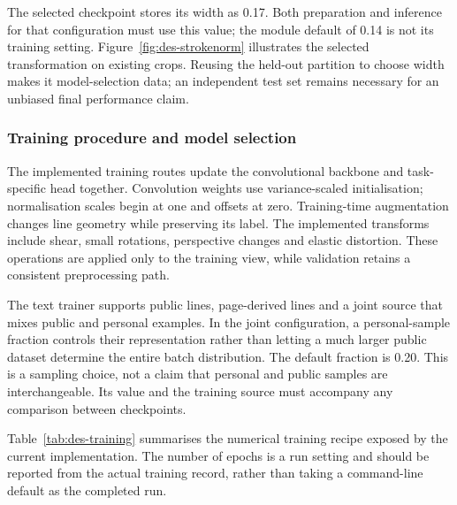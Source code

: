 The selected checkpoint stores its width as 0.17. Both preparation and inference for that configuration must use this value; the module default of 0.14 is not its training setting. Figure~\ref{fig:des-strokenorm} illustrates the selected transformation on existing crops. Reusing the held-out partition to choose width makes it model-selection data; an independent test set remains necessary for an unbiased final performance claim.


\subsubsection{Training procedure and model selection}
\label{sec:des-training}
The implemented training routes update the convolutional backbone and task-specific head together. Convolution weights use variance-scaled initialisation; normalisation scales begin at one and offsets at zero. Training-time augmentation changes line geometry while preserving its label. The implemented transforms include shear, small rotations, perspective changes and elastic distortion. These operations are applied only to the training view, while validation retains a consistent preprocessing path.


The text trainer supports public lines, page-derived lines and a joint source that mixes public and personal examples. In the joint configuration, a personal-sample fraction controls their representation rather than letting a much larger public dataset determine the entire batch distribution. The default fraction is 0.20. This is a sampling choice, not a claim that personal and public samples are interchangeable. Its value and the training source must accompany any comparison between checkpoints.

Table~\ref{tab:des-training} summarises the numerical training recipe exposed by the current implementation. The number of epochs is a run setting and should be reported from the actual training record, rather than taking a command-line default as the completed run.


